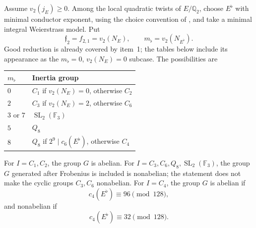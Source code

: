 \documentclass[11pt,reqno]{amsart}
\theoremstyle{definition}
\theoremstyle{remark}
\newcommand{\Q}{\mathbb Q}
\newcommand{\SL}{\operatorname{SL}}
\begin{document}
Assume $v_2(j_E)\geq0$.  Among the local quadratic twists of $E/\Q_2$,
choose $E^\flat$ with minimal conductor exponent, using the choice convention
of \cite[Table~4]{MartinWatkins}, and take a minimal integral Weierstrass
model.  Put
\begin{equation*}
 \mathfrak f_2=f_{2,1}=v_2(N_E),\qquad
 m_\flat=v_2(N_{E^\flat}).
\end{equation*}
Good reduction is already covered by item~1; the tables below include its
appearance as the $m_\flat=0$, $v_2(N_E)=0$ subcase.
The possibilities are
\begin{center}
\begin{tabular}{@{}ll@{}}
\toprule
$m_\flat$ & Inertia group \\
\midrule
$0$ & $C_1$ if $v_2(N_E)=0$, otherwise $C_2$ \\
$2$ & $C_3$ if $v_2(N_E)=2$, otherwise $C_6$ \\
$3$ or $7$ & $\SL_2(\mathbb F_3)$ \\
$5$ & $Q_8$ \\
$8$ & $Q_8$ if $2^9\mid c_6(E^\flat)$, otherwise $C_4$ \\
\bottomrule
\end{tabular}
\end{center}
For $I=C_1,C_2$, the group $G$ is abelian.  For
$I=C_3,C_6,Q_8,\SL_2(\mathbb F_3)$, the group $G$ generated after Frobenius
is included is nonabelian; the statement does not make the cyclic groups
$C_3,C_6$ nonabelian.  For $I=C_4$, the group $G$ is abelian if
\begin{equation*}
 c_4(E^\flat)\equiv96\pmod{128},
\end{equation*}
and nonabelian if
\begin{equation*}
 c_4(E^\flat)\equiv32\pmod{128}.
\end{equation*}
\end{document}

